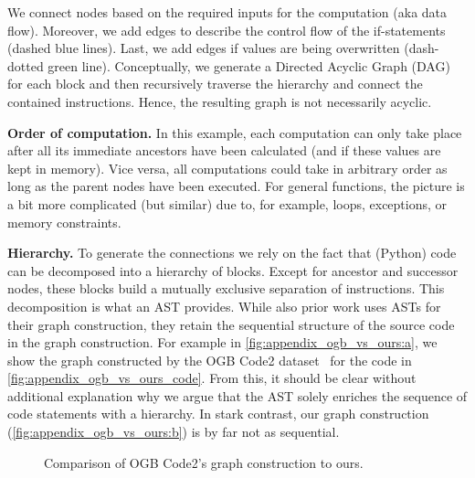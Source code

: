 \documentclass{article}
\begin{document}
We connect nodes based on the required inputs for the computation (aka data flow). Moreover, we add edges to describe the control flow of the if-statements (dashed blue lines). Last, we add edges if values are being overwritten (dash-dotted green line). Conceptually, we generate a Directed Acyclic Graph (DAG) for each block and then recursively traverse the hierarchy and connect the contained instructions. Hence, the resulting graph is not necessarily acyclic.

\textbf{Order of computation.} In this example, each computation can only take place after all its immediate ancestors have been calculated (and if these values are kept in memory). Vice versa, all computations could take in arbitrary order as long as the parent nodes have been executed. For general functions, the picture is a bit more complicated (but similar) due to, for example, loops, exceptions, or memory constraints.

\textbf{Hierarchy.} To generate the connections we rely on the fact that (Python) code can be decomposed into a hierarchy of blocks. Except for ancestor and successor nodes, these blocks build a mutually exclusive separation of instructions. This decomposition is what an AST provides. While also prior work uses ASTs for their graph construction, they retain the sequential structure of the source code in the graph construction. For example in \autoref{fig:appendix_ogb_vs_ours:a}, we show the graph constructed by the OGB Code2 dataset~\citep{hu_open_2020} for the code in \autoref{fig:appendix_ogb_vs_ours_code}. From this, it should be clear without additional explanation why we argue that the AST solely enriches the sequence of code statements with a hierarchy. In stark contrast, our graph construction (\autoref{fig:appendix_ogb_vs_ours:b}) is by far not as sequential.

\begin{figure}[H]
    \hfill
    \hfill
    \hfill
    \caption{Comparison of OGB Code2's graph construction to ours. \label{fig:appendix_ogb_vs_ours}}
\end{figure}
\end{document}
